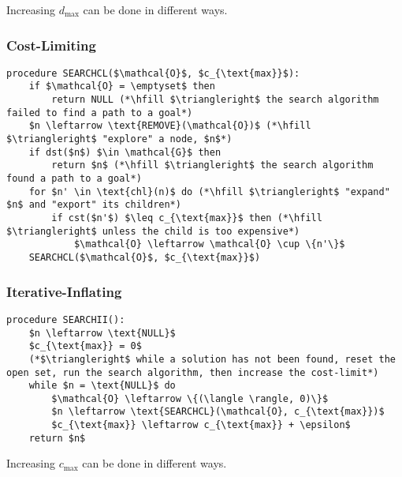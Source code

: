 \begin{warning}
    Increasing $d_{\text{max}}$ can be done in different ways.
\end{warning}

\subsubsection{Cost-Limiting}
\begin{algo}

\begin{lstlisting}
procedure SEARCHCL($\mathcal{O}$, $c_{\text{max}}$):
    if $\mathcal{O} = \emptyset$ then
        return NULL (*\hfill $\triangleright$ the search algorithm failed to find a path to a goal*)
    $n \leftarrow \text{REMOVE}(\mathcal{O})$ (*\hfill $\triangleright$ "explore" a node, $n$*)
    if dst($n$) $\in \mathcal{G}$ then
        return $n$ (*\hfill $\triangleright$ the search algorithm found a path to a goal*)
    for $n' \in \text{chl}(n)$ do (*\hfill $\triangleright$ "expand" $n$ and "export" its children*)
        if cst($n'$) $\leq c_{\text{max}}$ then (*\hfill $\triangleright$ unless the child is too expensive*)
            $\mathcal{O} \leftarrow \mathcal{O} \cup \{n'\}$
    SEARCHCL($\mathcal{O}$, $c_{\text{max}}$)
\end{lstlisting}

\end{algo}
\newpage

\subsubsection{Iterative-Inflating}
\begin{algo}
\begin{lstlisting}
procedure SEARCHII():
    $n \leftarrow \text{NULL}$
    $c_{\text{max}} = 0$
    (*$\triangleright$ while a solution has not been found, reset the open set, run the search algorithm, then increase the cost-limit*)
    while $n = \text{NULL}$ do
        $\mathcal{O} \leftarrow \{(\langle \rangle, 0)\}$
        $n \leftarrow \text{SEARCHCL}(\mathcal{O}, c_{\text{max}})$
        $c_{\text{max}} \leftarrow c_{\text{max}} + \epsilon$
    return $n$
\end{lstlisting}

\end{algo}

\begin{warning}
    Increasing $c_{\text{max}}$ can be done in different ways.
\end{warning}

